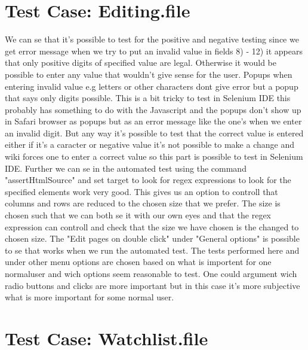 \documentclass[a4paper,10pt]{article}
\begin{document}
\section{Test Case: Editing.file}

We can se that it’s possible to test for the positive and negative testing since we get error message when we
try to put an invalid value in fields 8) - 12) it appears that only positive digits of specified value are legal. Otherwise
it would be possible to enter any value that wouldn’t give sense for the user. Popups when entering invalid value e.g letters
or other characters dont give error but a popup that says only digits possible. This is a bit tricky to test in Selenium IDE this
probably has something to do with the Javascript and the popups don't show up in Safari browser as popups but as an error message
like the one's when we enter an invalid digit. But any way it's possible to test that the correct value is entered either if 
it's a caracter or negative value it's not possible to make a change and wiki forces one to enter a correct value so this part
is possible to test in Selenium IDE. Further we can se in the automated test using the command "assertHtmlSource" and set target
to look for regex expressions to look for the specified elements work very good. This gives us an option to controll that 
columns and rows are reduced to the chosen size that we prefer. The size is chosen such that we can both se it with our own
eyes and that the regex expression can controll and check that the size we have chosen is the changed to chosen size.
The "Edit pages on double click" under "General options" is possible to se that works when we run the automated test.
The tests performed here and under other menu options are chosen based on what is importent for one normaluser and
wich options seem reasonable to test. One could argument wich radio buttons and clicks are more important but in this case
it's more subjective what is more important for some normal user.



\section{Test Case: Watchlist.file}
\end{document}
